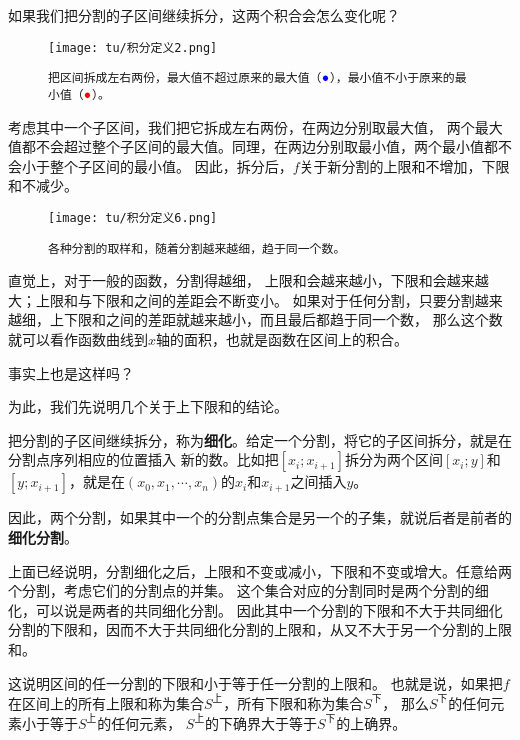 \documentclass[12pt,UTF8]{ctexbook}
\begin{document}
\begin{appendix}
如果我们把分割的子区间继续拆分，这两个积合会怎么变化呢？

\begin{wrapfigure}[8]{l}{0.52\textwidth} 
    \vspace{-32pt}
    \flushleft
    \texttt{[image: tu/积分定义2.png]}
    \caption*{\texttt{把区间拆成左右两份，最大值不超过原来的最大值（${\color{blue} \bullet}$），最小值不小于原来的最小值（${\color{red} \bullet}$）。}}
\end{wrapfigure}

考虑其中一个子区间，我们把它拆成左右两份，在两边分别取最大值，
两个最大值都不会超过整个子区间的最大值。同理，在两边分别取最小值，两个最小值都不会小于整个子区间的最小值。
因此，拆分后，$f$关于新分割的上限和不增加，下限和不减少。

\begin{wrapfigure}[8]{r}{0.32\textwidth} %
    \vspace{-35pt}
    \flushright
    \texttt{[image: tu/积分定义6.png]}
    \caption*{\texttt{各种分割的取样和，随着分割越来越细，趋于同一个数。}}
\end{wrapfigure}

直觉上，对于一般的函数，分割得越细，
上限和会越来越小，下限和会越来越大；上限和与下限和之间的差距会不断变小。
如果对于任何分割，只要分割越来越细，上下限和之间的差距就越来越小，而且最后都趋于同一个数，
那么这个数就可以看作函数曲线到$x$轴的面积，也就是函数在区间上的积合。

事实上也是这样吗？

为此，我们先说明几个关于上下限和的结论。

把分割的子区间继续拆分，称为\textbf{细化}。给定一个分割，将它的子区间拆分，就是在分割点序列相应的位置插入
新的数。比如把$[x_i; x_{i+1}]$拆分为两个区间$[x_i; y]$和$[y; x_{i+1}]$，就是在$(x_0, x_1, \cdots, x_n)$的$x_i$和$x_{i+1}$之间插入$y$。

因此，两个分割，如果其中一个的分割点集合是另一个的子集，就说后者是前者的\textbf{细化分割}。

上面已经说明，分割细化之后，上限和不变或减小，下限和不变或增大。任意给两个分割，考虑它们的分割点的并集。
这个集合对应的分割同时是两个分割的细化，可以说是两者的共同细化分割。
因此其中一个分割的下限和不大于共同细化分割的下限和，因而不大于共同细化分割的上限和，从又不大于另一个分割的上限和。

这说明区间的任一分割的下限和小于等于任一分割的上限和。
也就是说，如果把$f$在区间上的所有上限和称为集合$S^{\text{上}}$，所有下限和称为集合$S^{\text{下}}$，
那么$S^{\text{下}}$的任何元素小于等于$S^{\text{上}}$的任何元素，
$S^{\text{上}}$的下确界大于等于$S^{\text{下}}$的上确界。


\end{appendix}
\end{document}
